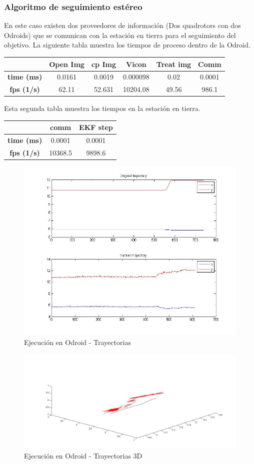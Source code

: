 	
	\subsubsection{Algoritmo de seguimiento est\'ereo}
		En este caso existen dos proveedores de informaci\'on (Dos quadrotors con dos Odroids) que se comunican con la estaci\'on en tierra para el seguimiento del objetivo. La siguiente tabla muestra los tiempos de proceso dentro de la Odroid.
		\newline
		\newline
		{
		\centering
			\begin{tabular}{|c|c|c|c|c|c|}
			\hline  					&  Open Img	&  cp Img 	& Vicon 	& Treat img & Comm  		\\ 
			\hline  \textbf{time (ms)}	& 	0.0161	& 0.0019	&	0.000098&  	 0.02	&	0.0001		\\ 
			\hline  \textbf{fps (1/s)}	&  	62.11	&  52.631	& 10204.08 	&  49.56	&	986.1	\\ 
			\hline 
			\end{tabular} 
		}
		\newline
		
		Esta segunda tabla muestra los tiempos en la estaci\'on en tierra.
		\newline
		
		{
		\centering
			\begin{tabular}{|c|c|c|}
			\hline  					&  comm		&  EKF step	\\
			\hline  \textbf{time (ms)}	& 	0.0001	& 	0.0001	\\
			\hline  \textbf{fps (1/s)}	&  	10368.5	&   9898.6 	\\
			\hline 
			\end{tabular} 
		}
		\newline
	\begin{figure}[ph]
		\centering
		\includegraphics[width=0.7\linewidth]{../Images/c4/arch_trajs_stero}
		\caption{Ejecuci\'on en Odroid - Trayectorias}
		\label{fig:arch_trajs_stero}
	\end{figure}
	
	\begin{figure}[ph]
		\centering
		\includegraphics[width=0.6\linewidth]{../Images/c4/arch_3d_trajs_stero}
		\caption{Ejecuci\'on en Odroid - Trayectorias 3D}
		\label{fig:arch_3d_trajs_stero}
	\end{figure}
